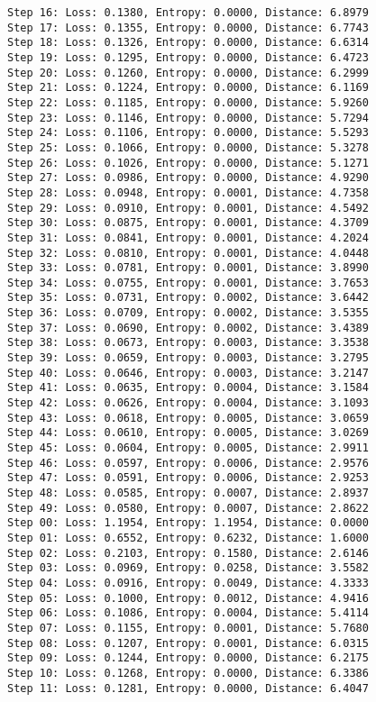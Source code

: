 \documentclass[11pt]{article}
\begin{document}
\begin{Verbatim}[commandchars=\\\{\}]
Step 16: Loss: 0.1380, Entropy: 0.0000, Distance: 6.8979
Step 17: Loss: 0.1355, Entropy: 0.0000, Distance: 6.7743
Step 18: Loss: 0.1326, Entropy: 0.0000, Distance: 6.6314
Step 19: Loss: 0.1295, Entropy: 0.0000, Distance: 6.4723
Step 20: Loss: 0.1260, Entropy: 0.0000, Distance: 6.2999
Step 21: Loss: 0.1224, Entropy: 0.0000, Distance: 6.1169
Step 22: Loss: 0.1185, Entropy: 0.0000, Distance: 5.9260
Step 23: Loss: 0.1146, Entropy: 0.0000, Distance: 5.7294
Step 24: Loss: 0.1106, Entropy: 0.0000, Distance: 5.5293
Step 25: Loss: 0.1066, Entropy: 0.0000, Distance: 5.3278
Step 26: Loss: 0.1026, Entropy: 0.0000, Distance: 5.1271
Step 27: Loss: 0.0986, Entropy: 0.0000, Distance: 4.9290
Step 28: Loss: 0.0948, Entropy: 0.0001, Distance: 4.7358
Step 29: Loss: 0.0910, Entropy: 0.0001, Distance: 4.5492
Step 30: Loss: 0.0875, Entropy: 0.0001, Distance: 4.3709
Step 31: Loss: 0.0841, Entropy: 0.0001, Distance: 4.2024
Step 32: Loss: 0.0810, Entropy: 0.0001, Distance: 4.0448
Step 33: Loss: 0.0781, Entropy: 0.0001, Distance: 3.8990
Step 34: Loss: 0.0755, Entropy: 0.0001, Distance: 3.7653
Step 35: Loss: 0.0731, Entropy: 0.0002, Distance: 3.6442
Step 36: Loss: 0.0709, Entropy: 0.0002, Distance: 3.5355
Step 37: Loss: 0.0690, Entropy: 0.0002, Distance: 3.4389
Step 38: Loss: 0.0673, Entropy: 0.0003, Distance: 3.3538
Step 39: Loss: 0.0659, Entropy: 0.0003, Distance: 3.2795
Step 40: Loss: 0.0646, Entropy: 0.0003, Distance: 3.2147
Step 41: Loss: 0.0635, Entropy: 0.0004, Distance: 3.1584
Step 42: Loss: 0.0626, Entropy: 0.0004, Distance: 3.1093
Step 43: Loss: 0.0618, Entropy: 0.0005, Distance: 3.0659
Step 44: Loss: 0.0610, Entropy: 0.0005, Distance: 3.0269
Step 45: Loss: 0.0604, Entropy: 0.0005, Distance: 2.9911
Step 46: Loss: 0.0597, Entropy: 0.0006, Distance: 2.9576
Step 47: Loss: 0.0591, Entropy: 0.0006, Distance: 2.9253
Step 48: Loss: 0.0585, Entropy: 0.0007, Distance: 2.8937
Step 49: Loss: 0.0580, Entropy: 0.0007, Distance: 2.8622
Step 00: Loss: 1.1954, Entropy: 1.1954, Distance: 0.0000
Step 01: Loss: 0.6552, Entropy: 0.6232, Distance: 1.6000
Step 02: Loss: 0.2103, Entropy: 0.1580, Distance: 2.6146
Step 03: Loss: 0.0969, Entropy: 0.0258, Distance: 3.5582
Step 04: Loss: 0.0916, Entropy: 0.0049, Distance: 4.3333
Step 05: Loss: 0.1000, Entropy: 0.0012, Distance: 4.9416
Step 06: Loss: 0.1086, Entropy: 0.0004, Distance: 5.4114
Step 07: Loss: 0.1155, Entropy: 0.0001, Distance: 5.7680
Step 08: Loss: 0.1207, Entropy: 0.0001, Distance: 6.0315
Step 09: Loss: 0.1244, Entropy: 0.0000, Distance: 6.2175
Step 10: Loss: 0.1268, Entropy: 0.0000, Distance: 6.3386
Step 11: Loss: 0.1281, Entropy: 0.0000, Distance: 6.4047

\end{Verbatim}
\end{document}
